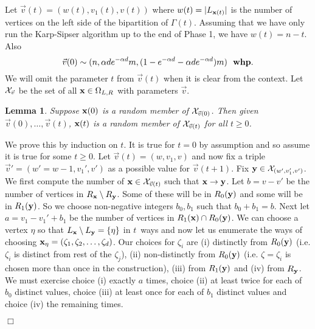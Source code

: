 \documentclass[11pt]{article}
\def\mstar{\mnote{****}}
\newenvironment{proof}{{\bf Proof:}}{\hfill\mbox{$\Box$}}
\def\bx{{\bf x}}
\def\by{{\bf y}}
\def\bx{{\bf x}}
\def\a{\alpha}
\def\G{\Gamma}
\def\z{\zeta}
\def\whp{{\bf whp}}
\newcommand{\mnote}[1]{\marginpar{\footnotesize\raggedright#1}}
\newcommand{\set}[1]{\left\{#1\right\}}
\def\cX{{\cal X}}
\def\Gv{\cX_{\vv}}
\def\vv{\vec{v}}
\newtheorem{lemma}[theorem]{Lemma}
\newcommand{\beq}[1]{\begin{equation}\label{#1}}
\newcommand{\eeq}{\end{equation}}
\begin{document}
Let $\vv(t) =
(w(t),v_1(t),v(t))$ where $w(t)=|L_{\bx(t)}|$ is the number of vertices on the left
side of the bipartition of $\G(t)$. Assuming that we have only run the Karp-Sipser algorithm up to the
end of Phase 1, we have $w(t) = n-t$. Also 
\beq{begin}
\vv(0)\sim (n,\a d e^{-\a d}m,(1-e^{-\a d}-\a d e^{-\a d})m)\ \ \whp. 
\eeq
We will omit the parameter
$t$ from $\vv(t)$ when it is clear from the context. 
Let $\Gv$ be
the set of all $\bx\in \Omega_{L,R}$ with parameters $\vv$.

\begin{lemma}\label{lem2}
Suppose $\bx(0)$ is a random member of $\cX_{\vv(0)}$. Then given $\vv(0),\ldots, \vv(t)$, $\bx(t)$
is a random member of $\cX_{\vv(t)}$ for all $t\ge 0$.
\end{lemma}
\begin{proof}
We prove this by induction on $t$. It is true for $t=0$ by assumption and so assume it is true for some $t\geq 0$.
Let $\vv(t)=(w,v_1,v)$ and now fix a triple $\vv'=(w'=w-1,v_1',v')$ as a possible value for $\vv(t+1)$. Fix $\by\in \cX_{(w',v_1',v')}$.
We first compute the
number of $\bx\in\cX_{\vv(t)}$ such that $\bx\to\by$. Let $b=v-v'$ be the number of vertices in $R_\bx\setminus R_\by$. Some of these
will be in $R_0(\by)$ and some will be in $R_1(\by)$. So we choose non-negative integers $b_0,b_1$ such that 
$b_0+b_1=b$. Next let $a=v_1-v_1'+b_1$ be the number of vertices in $R_1(\bx)\cap R_0(\by)$. 
We can choose a vertex $\eta$ so that $L_\bx\setminus L_\by=\set{\eta}$ in $t$\mstar\  
ways and now let us enumerate the ways of choosing $\bx_\eta=(\z_1,\z_2,\ldots,\z_d)$.
Our choices for $\z_i$ are (i) distinctly from $R_0(\by)$ (i.e. $\z_i$ is distinct from rest of the $\z_j$), (ii) 
non-distinctly from $R_0(\by)$ (i.e. $\z=\z_i$ is chosen more than once in the construction), (iii) from $R_1(\by)$ and 
(iv) from $R_\by$. We must exercise choice (i) exactly $a$ times, choice (ii) at least twice for each of $b_0$ distinct values,
choice (iii) at least once for each of $b_1$ distinct values and choice (iv) the remaining times.


\end{proof}
\end{document}
